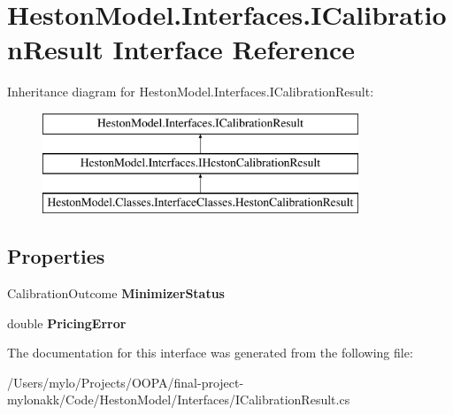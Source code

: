 \hypertarget{interface_heston_model_1_1_interfaces_1_1_i_calibration_result}{}\section{Heston\+Model.\+Interfaces.\+I\+Calibration\+Result Interface Reference}
\label{interface_heston_model_1_1_interfaces_1_1_i_calibration_result}
Inheritance diagram for Heston\+Model.\+Interfaces.\+I\+Calibration\+Result\+:\begin{figure}[H]
\begin{center}
\leavevmode
\includegraphics[height=3.000000cm]{interface_heston_model_1_1_interfaces_1_1_i_calibration_result}
\end{center}
\end{figure}
\subsection*{Properties}
\begin{DoxyCompactItemize}
\item 
\mbox{\label{interface_heston_model_1_1_interfaces_1_1_i_calibration_result_a71c76830d0200e3da05a01408f2b3961}} 
Calibration\+Outcome {\bfseries Minimizer\+Status}
\item 
\mbox{\label{interface_heston_model_1_1_interfaces_1_1_i_calibration_result_a902bd7c3d537432d71e2f09718ae795b}} 
double {\bfseries Pricing\+Error}
\end{DoxyCompactItemize}


The documentation for this interface was generated from the following file\+:\begin{DoxyCompactItemize}
\item 
/\+Users/mylo/\+Projects/\+O\+O\+P\+A/final-\/project-\/mylonakk/\+Code/\+Heston\+Model/\+Interfaces/I\+Calibration\+Result.\+cs\end{DoxyCompactItemize}
